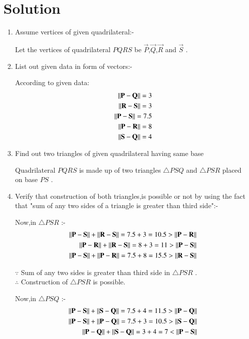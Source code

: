 \documentclass[journal,12pt,twocolumn]{IEEEtran}
\begin{document}
\section{Solution}
\begin{enumerate}
    \item Assume vertices of given quadrilateral:-
    
    Let the vertices of quadrilateral $PQRS$ be $\vec{P}$,$\vec{Q}$,$\vec{R}$ and $\vec{S}$ .
    
    \item List out given data in form of vectors:-
    
    According to given data:
    \begin{align}
    \left\lVert\mathbf{P}-\mathbf{Q}\right\rVert = 3
    \\
    \left\lVert\mathbf{R}-\mathbf{S}\right\rVert = 3
    \\
    \left\lVert\mathbf{P}-\mathbf{S}\right\rVert = 7.5
    \\
    \left\lVert\mathbf{P}-\mathbf{R}\right\rVert = 8
    \\
    \left\lVert\mathbf{S}-\mathbf{Q}\right\rVert = 4
    \end{align}
    
    \item Find out two triangles of given quadrilateral having same base
    
    Quadrilateral $PQRS$ is made up of two triangles $\triangle PSQ$ and $\triangle PSR$ placed on base $PS$ .
    
    \item Verify that construction of both triangles,is possible or not by using the fact that "sum of any two sides of a triangle is greater than third side":-
    
    Now,in $\triangle PSR$ :-
    \begin{align}
    \left\lVert\mathbf{P}-\mathbf{S}\right\rVert + \left\lVert\mathbf{R}-\mathbf{S}\right\rVert = 7.5 + 3 =10.5 > \left\lVert\mathbf{P}-\mathbf{R}\right\rVert
    \\
    \left\lVert\mathbf{P}-\mathbf{R}\right\rVert + \left\lVert\mathbf{R}-\mathbf{S}\right\rVert = 8 + 3 =11 > \left\lVert\mathbf{P}-\mathbf{S}\right\rVert
    \\
    \left\lVert\mathbf{P}-\mathbf{S}\right\rVert + \left\lVert\mathbf{P}-\mathbf{R}\right\rVert = 7.5 + 8 =15.5 > \left\lVert\mathbf{R}-\mathbf{S}\right\rVert
    \end{align}

    $\because$ Sum of any two sides is greater than third side in $\triangle PSR$ .
    \\
    $\therefore$ Construction of $\triangle PSR$ is possible.

    Now,in $\triangle PSQ$ :-
    \begin{align}
    \left\lVert\mathbf{P}-\mathbf{S}\right\rVert + \left\lVert\mathbf{S}-\mathbf{Q}\right\rVert = 7.5 + 4 =11.5 > \left\lVert\mathbf{P}-\mathbf{Q}\right\rVert
    \\
    \left\lVert\mathbf{P}-\mathbf{S}\right\rVert + \left\lVert\mathbf{P}-\mathbf{Q}\right\rVert = 7.5 + 3 =10.5 > \left\lVert\mathbf{S}-\mathbf{Q}\right\rVert
    \\
    \left\lVert\mathbf{P}-\mathbf{Q}\right\rVert + \left\lVert\mathbf{S}-\mathbf{Q}\right\rVert = 3 + 4 =7 < \left\lVert\mathbf{P}-\mathbf{S}\right\rVert
    \end{align}


\end{enumerate}
\end{document}
